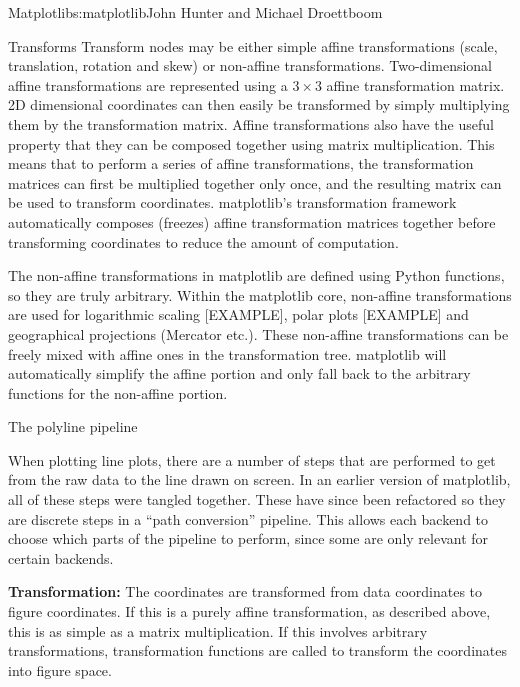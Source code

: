 \begin{aosachapter}{Matplotlib}{s:matplotlib}{John Hunter and Michael Droettboom}
\begin{aosasect1}{Transforms}
Transform nodes may be either simple affine transformations (scale,
translation, rotation and skew) or non-affine transformations.
Two-dimensional affine transformations are represented using a $3
\times 3$ affine transformation matrix.  2D dimensional coordinates can
then easily be transformed by simply multiplying them by the
transformation matrix.  Affine transformations also have the useful
property that they can be composed together using matrix
multiplication.  This means that to perform a series of affine
transformations, the transformation matrices can first be multiplied
together only once, and the resulting matrix can be used to transform
coordinates.  matplotlib's transformation framework automatically
composes (freezes) affine transformation matrices together before
transforming coordinates to reduce the amount of computation.

The non-affine transformations in matplotlib are defined using Python
functions, so they are truly arbitrary.  Within the matplotlib core,
non-affine transformations are used for logarithmic scaling [EXAMPLE],
polar plots [EXAMPLE] and geographical projections (Mercator etc.).
These non-affine transformations can be freely mixed with affine ones
in the transformation tree.  matplotlib will automatically simplify
the affine portion and only fall back to the arbitrary functions for
the non-affine portion.


\end{aosasect1}

\begin{aosasect1}{The polyline pipeline}

When plotting line plots, there are a number of steps that are
performed to get from the raw data to the line drawn on screen.  In an
earlier version of matplotlib, all of these steps were tangled
together.  These have since been refactored so they are discrete steps
in a ``path conversion'' pipeline.  This allows each backend to choose
which parts of the pipeline to perform, since some are only relevant
for certain backends.

\begin{aosaenumerate}

\item \textbf{Transformation:} The coordinates are transformed from data
  coordinates to figure coordinates.  If this is a purely affine
  transformation, as described above, this is as simple as a matrix
  multiplication.  If this involves arbitrary transformations,
  transformation functions are called to transform the coordinates
  into figure space.


\end{aosaenumerate}
\end{aosasect1}
\end{aosachapter}
